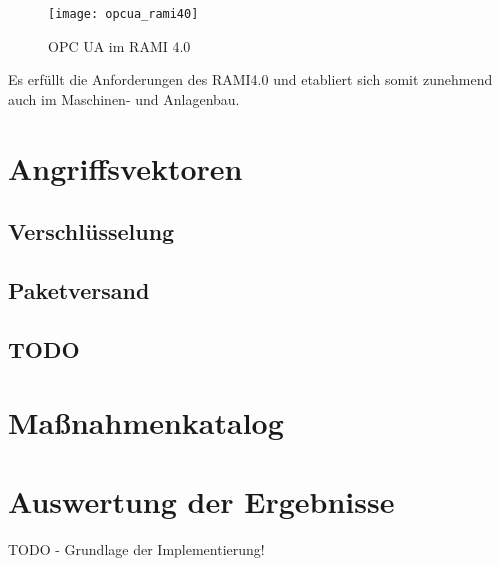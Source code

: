 \begin{figure}[h]
    \centering
    \texttt{[image: opcua\_rami40]}
    \caption{OPC UA im RAMI 4.0}
    \label{Kap3:OPC UA im RAMI 4.0}
  \end{figure}
  
\clearpage

Es erfüllt die Anforderungen des \ac{RAMI4.0} und etabliert sich somit zunehmend auch im Maschinen- und Anlagenbau.

\section{Angriffsvektoren}
\subsection{Verschlüsselung}
\subsection{Paketversand}
\subsection{TODO}

\section{Maßnahmenkatalog}

\section{Auswertung der Ergebnisse}
TODO - Grundlage der Implementierung!